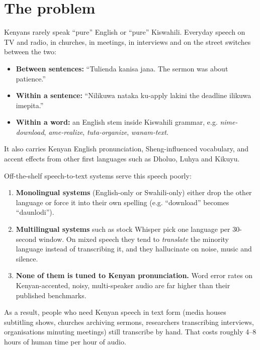 \documentclass[11pt]{article}
\begin{document}
\hypertarget{the-problem}{%
\section{The problem}\label{the-problem}}

Kenyans rarely speak ``pure'' English or ``pure'' Kiswahili. Everyday speech on TV and radio, in churches, in meetings, in interviews and on the street switches between the two:

\begin{itemize}
\tightlist
\item
  \textbf{Between sentences:} ``Tulienda kanisa jana. The sermon was about patience.''
\item
  \textbf{Within a sentence:} ``Nilikuwa nataka ku-apply lakini the deadline ilikuwa imepita.''
\item
  \textbf{Within a word:} an English stem inside Kiswahili grammar, e.g. \emph{nime-download}, \emph{ame-realize}, \emph{tuta-organize}, \emph{wanam-text}.
\end{itemize}

It also carries Kenyan English pronunciation, Sheng-influenced vocabulary, and accent effects from other first languages such as Dholuo, Luhya and Kikuyu.

Off-the-shelf speech-to-text systems serve this speech poorly:

\begin{enumerate}
\def\labelenumi{\arabic{enumi}.}
\tightlist
\item
  \textbf{Monolingual systems} (English-only or Swahili-only) either drop the other language or force it into their own spelling (e.g. ``download'' becomes ``daunlodi'').
\item
  \textbf{Multilingual systems} such as stock Whisper pick one language per 30-second window. On mixed speech they tend to \emph{translate} the minority language instead of transcribing it, and they hallucinate on noise, music and silence.
\item
  \textbf{None of them is tuned to Kenyan pronunciation.} Word error rates on Kenyan-accented, noisy, multi-speaker audio are far higher than their published benchmarks.
\end{enumerate}

As a result, people who need Kenyan speech in text form (media houses subtitling shows, churches archiving sermons, researchers transcribing interviews, organisations minuting meetings) still transcribe by hand. That costs roughly 4--8 hours of human time per hour of audio.
\end{document}
